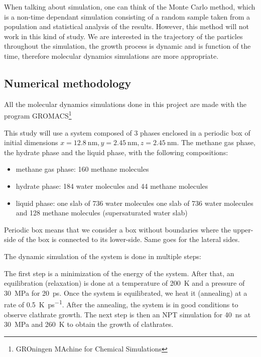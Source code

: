 When talking about simulation, one can think of the Monte Carlo method, which is a non-time dependant simulation consisting of a random sample taken from a population and statistical analysis of the results. However, this method will not work in this kind of study. We are interested in the trajectory of the particles throughout the simulation, the growth process is dynamic and is function of the time, therefore molecular dynamics simulations are more appropriate.

\subsection{Numerical methodology}
All the molecular dynamics simulations done in this project are made with the program GROMACS\footnote{GROningen MAchine for Chemical Simulations}

This study will use a system composed of 3 phases enclosed in a periodic box of initial dimensions $x = \SI{12.8}{\nano\meter}, y = \SI{2.45}{\nano\meter}, z = \SI{2.45}{\nano\meter}$. The methane gas phase, the hydrate phase and the liquid phase, with the following compositions:

\begin{itemize}
    \item methane gas phase: 160 methane molecules
    \item hydrate phase: 184 water molecules and 44 methane molecules
    \item liquid phase:
        \subitem one slab of 736 water molecules
        \subitem one slab of 736 water molecules and 128 methane molecules (supersaturated water slab)
\end{itemize}

Periodic box means that we consider a box without boundaries where the upper-side of the box is connected to its lower-side. Same goes for the lateral sides.  

The dynamic simulation of the system is done in multiple steps:

The first step is a minimization of the energy of the system. After that, an equilibration (relaxation) is done at a temperature of \SI{200}{\kelvin} and a pressure of \SI{30}{\mega\pascal} for \SI{20}{\pico\second}. Once the system is equilibrated, we heat it (annealing) at a rate of \SI{0.5}{\kelvin\per\pico\second}. After the annealing, the system is in good conditions to observe clathrate growth. The next step is then an NPT simulation for \SI{40}{\nano\second} at \SI{30}{\mega\pascal} and \SI{260}{\kelvin} to obtain the growth of clathrates.

